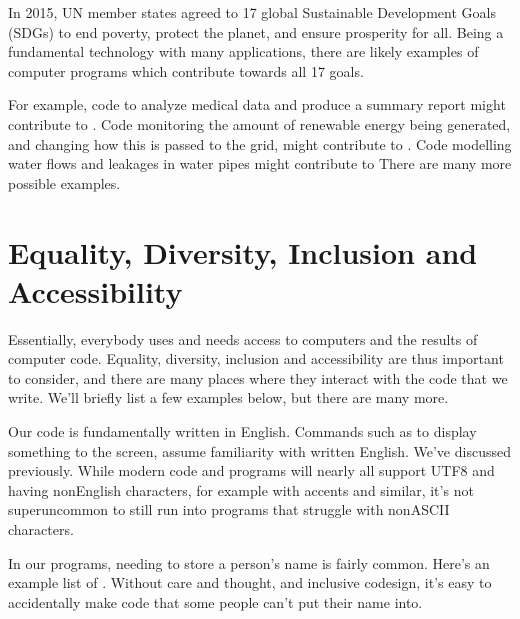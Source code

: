 \documentclass[letterpaper,10pt,british]{sphinxmanual}
\begin{document}
\sphinxAtStartPar
In 2015, UN member states agreed to 17 global Sustainable Development Goals (SDGs) to end poverty, protect the planet, and ensure prosperity for all. Being a fundamental technology with many applications, there are likely examples of computer programs which contribute towards all 17 goals.

\sphinxAtStartPar
For example, code to analyze medical data and produce a summary report might contribute to . Code monitoring the amount of renewable energy being generated, and changing how this is passed to the grid, might contribute to . Code modelling water flows and leakages in water pipes might contribute to  There are many more possible examples.


\section{Equality, Diversity, Inclusion and Accessibility}
\label{\detokenize{chapters/wider_factors:equality-diversity-inclusion-and-accessibility}}
\sphinxAtStartPar
Essentially, everybody uses and needs access to computers and the results of computer code. Equality, diversity, inclusion and accessibility are thus important to consider, and there are many places where they interact with the code that we write. We’ll briefly list a few examples below, but there are many more.

\sphinxAtStartPar
Our code is fundamentally written in English. Commands such as  to display something to the screen, assume familiarity with written English. We’ve discussed {\hyperref[\detokenize{chapters/programming_fundamentals/text_encoding:text-encoding}]{}} previously. While modern code and programs will nearly all support UTF\sphinxhyphen{}8 and having non\sphinxhyphen{}English characters, for example with accents and similar, it’s not super\sphinxhyphen{}uncommon to still run into programs that struggle with non\sphinxhyphen{}ASCII characters.

\sphinxAtStartPar
In our programs, needing to store a person’s name is fairly common. Here’s an example list of . Without care and thought, and inclusive co\sphinxhyphen{}design, it’s easy to accidentally make code that some people can’t put their name into.
\end{document}
